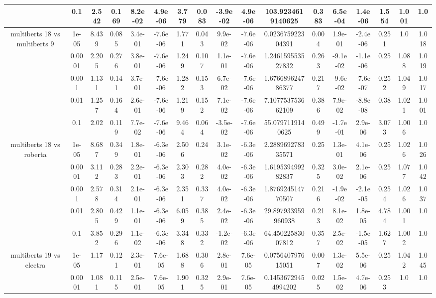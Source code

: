 \begin{tabular}{|c|c|c|c|c|c|c|c|c|c|c|c|c|c|c|c|c|}
 & 0.1 & 2.542 & 0.169 & 8.2e-02 & 4.9e-06 & 3.779 & 0.083 & -3.9e-02 & 4.9e-06 & 103.9234619140625 & 0.383 & 6.5e-04 & 1.4e-06 & 1.554 & 1.001 & 1.0 \\
\hline
\multirow{5}{*}{multiberts 18 vs multiberts 9} & 1e-05 & 8.439 & 0.085 & 3.4e-01 & -7.6e-06 & 1.771 & 0.043 & 9.9e-02 & -7.6e-06 & 0.023675922304391 & 0.004 & 1.9e-01 & -2.4e-06 & 0.251 & 1.0 & 1.018 \\
 & 0.0001 & 2.205 & 0.276 & 3.8e-01 & -7.6e-06 & 1.249 & 0.107 & 1.1e-01 & -7.6e-06 & 1.246159553527832 & 0.263 & -9.1e-02 & -1.1e-06 & 0.25 & 1.088 & 1.019 \\
 & 0.001 & 1.131 & 0.141 & 3.7e-01 & -7.6e-06 & 1.282 & 0.153 & 6.7e-02 & -7.6e-06 & 1.676689624786377 & 0.217 & -9.6e-02 & -7.6e-07 & 0.252 & 1.049 & 1.017 \\
 & 0.01 & 1.257 & 0.164 & 2.6e-01 & -7.6e-06 & 1.219 & 0.152 & 7.1e-02 & -7.6e-06 & 7.107753753662109 & 0.386 & 7.9e-02 & -8.8e-08 & 0.38 & 1.021 & 1.001 \\
 & 0.1 & 2.02 & 0.119 & 7.7e-02 & -7.6e-06 & 9.464 & 0.064 & -3.5e-02 & -7.6e-06 & 55.0797119140625 & 0.499 & -1.7e-01 & 2.9e-06 & 3.073 & 1.006 & 1.0 \\
\hline
\multirow{5}{*}{multiberts 18 vs roberta } & 1e-05 & 8.687 & 0.349 & 1.8e-01 & -6.3e-06 & 2.506 & 0.24 & 3.1e-02 & -6.3e-06 & 2.288969278335571 & 0.25 & 1.3e-01 & 4.1e-06 & 0.25 & 1.026 & 1.026 \\
 & 0.0001 & 3.112 & 0.283 & 2.2e-01 & -6.3e-06 & 2.303 & 0.282 & 4.0e-02 & -6.3e-06 & 1.619539499282837 & 0.325 & 3.0e-02 & 2.1e-06 & 0.25 & 1.077 & 1.042 \\
 & 0.001 & 2.578 & 0.314 & 2.1e-01 & -6.3e-06 & 2.351 & 0.337 & 4.0e-02 & -6.3e-06 & 1.876924514770507 & 0.216 & -1.9e-02 & -2.1e-05 & 0.254 & 1.026 & 1.037 \\
 & 0.01 & 2.805 & 0.429 & 1.1e-01 & -6.3e-06 & 6.059 & 0.385 & 2.4e-02 & -6.3e-06 & 29.897933959960938 & 0.213 & 8.1e-02 & 1.8e-05 & 4.784 & 1.001 & 1.0 \\
 & 0.1 & 3.852 & 0.296 & 1.1e-02 & -6.3e-06 & 3.348 & 0.332 & -1.2e-02 & -6.3e-06 & 64.45022583007812 & 0.357 & 2.5e-02 & -1.5e-05 & 1.627 & 1.002 & 1.0 \\
\hline
\multirow{5}{*}{multiberts 19 vs electra } & 1e-05 & 1.17 & 0.121 & 2.3e-01 & 7.6e-05 & 1.688 & 0.306 & 2.8e-01 & 7.6e-05 & 0.075640797615051 & 0.007 & 1.3e-02 & 5.5e-06 & 0.25 & 1.042 & 1.045 \\
 & 0.0001 & 1.081 & 0.115 & 2.5e-01 & 7.6e-05 & 1.901 & 0.325 & 2.9e-01 & 7.6e-05 & 0.14536729454994202 & 0.025 & 1.5e-02 & 4.7e-06 & 0.253 & 1.0 & 1.0 \\

\end{tabular}
